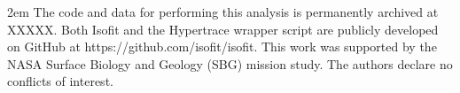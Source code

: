 \documentclass[draft]{agujournal2019}
\begin{document}
%
%

%

%




%
%
%
%
%
%
%
%


\acknowledgments
\emergencystretch 2em
The code and data for performing this analysis is permanently archived at XXXXX. %
Both Isofit and the Hypertrace wrapper script are publicly developed on GitHub at https://github.com/isofit/isofit.
This work was supported by the NASA Surface Biology and Geology (SBG) mission study.
The authors declare no conflicts of interest.

\fussy
\end{document}
